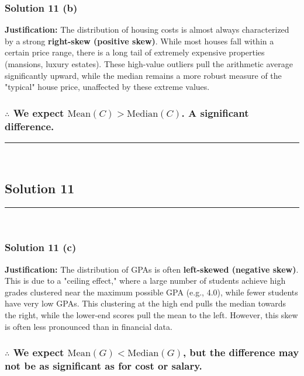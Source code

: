 \documentclass{article}
\begin{document}
\subsubsection*{Solution  11 (b)}

\parbox{\textwidth}{
    \textbf{Justification:} The distribution of housing costs is almost always characterized by a strong \textbf{right-skew (positive skew)}. While most houses fall within a certain price range, there is a long tail of extremely expensive properties (mansions, luxury estates). These high-value outliers pull the arithmetic average significantly upward, while the median remains a more robust measure of the "typical" house price, unaffected by these extreme values.
}

\subsubsection*{\normalfont $\therefore$ We expect $\text{Mean}(C) > \text{Median}(C)$. A significant difference.}

\noindent\rule{\textwidth}{0.4pt}\\

\newpage


\subsection*{Solution 11}
\noindent\rule{\textwidth}{0.4pt}\\
\subsubsection*{Solution  11 (c)}

\parbox{\textwidth}{
    \textbf{Justification:} The distribution of GPAs is often \textbf{left-skewed (negative skew)}. This is due to a "ceiling effect," where a large number of students achieve high grades clustered near the maximum possible GPA (e.g., 4.0), while fewer students have very low GPAs. This clustering at the high end pulls the median towards the right, while the lower-end scores pull the mean to the left. However, this skew is often less pronounced than in financial data.
}

\subsubsection*{\normalfont $\therefore$ We expect $\text{Mean}(G) < \text{Median}(G)$, but the difference may not be as significant as for cost or salary.}
\end{document}
